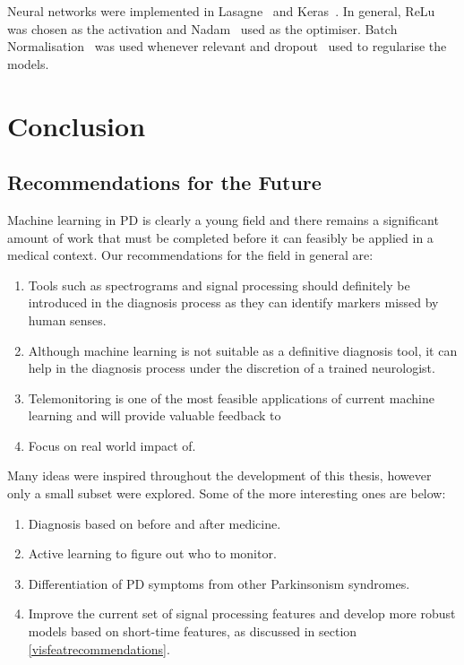 \documentclass[12pt, twoside]{book}
\begin{document}
Neural networks were implemented in Lasagne~\cite{lasagne} and Keras~\cite{keras}. In general, ReLu~\cite{relu} was chosen as the activation and Nadam~\cite{nadam} used as the optimiser. Batch Normalisation~\cite{batchnorm} was used whenever relevant and dropout~\cite{dropout} used to regularise the models. 



\chapter{Conclusion}



\section{Recommendations for the Future}
Machine learning in PD is clearly a young field and there remains a significant amount of work that must be completed before it can feasibly be applied in a medical context. Our recommendations for the field in general are:

\begin{enumerate}[noitemsep, topsep=-10pt]
	\item Tools such as spectrograms and signal processing should definitely be introduced in the diagnosis process as they can identify markers missed by human senses.
	\item Although machine learning is not suitable as a definitive diagnosis tool, it can help in the diagnosis process under the discretion of a trained neurologist.
	\item Telemonitoring is one of the most feasible applications of current machine learning and will provide valuable feedback to 
	\item Focus on real world impact of.
\end{enumerate}


Many ideas were inspired throughout the development of this thesis, however only a small subset were explored. Some of the more interesting ones are below:


\begin{enumerate}[noitemsep, topsep=-10pt]
	\item Diagnosis based on before and after medicine.
	\item Active learning to figure out who to monitor.
	\item Differentiation of PD symptoms from other Parkinsonism syndromes.
	\item Improve the current set of signal processing features and develop more robust models based on short-time features, as discussed in section \ref{visfeatrecommendations}.
\end{enumerate}


\backmatter


\end{document}
